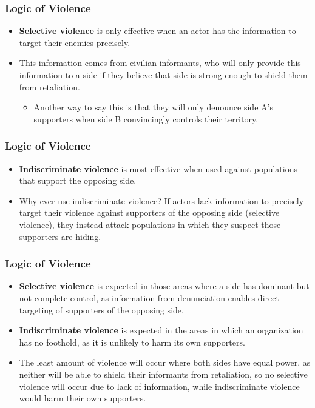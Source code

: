 \documentclass[handout]{beamer}
\begin{document}
\begin{frame} 
	\frametitle{\LARGE{Logic of Violence}}
	\begin{itemize}
		\item \textbf{Selective violence} is only effective when an actor has the information to target their enemies precisely. \pause
		\item This information comes from civilian informants, who will only provide this information to a side if they believe that side is strong enough to shield them from retaliation. 
		\begin{itemize}
			\item Another way to say this is that they will only denounce side A's supporters when side B convincingly controls their territory. \pause
		\end{itemize}
	\end{itemize}
\end{frame}

\begin{frame} 
	\frametitle{\LARGE{Logic of Violence}}
	\begin{itemize}
		\item \textbf{Indiscriminate violence} is most effective when used against populations that support the opposing side. \pause
		\item Why ever use indiscriminate violence? If actors lack information to precisely target their violence against supporters of the opposing side (selective violence), they instead attack populations in which they suspect those supporters are hiding. 
	\end{itemize}
\end{frame}


\begin{frame} 
	\frametitle{\LARGE{Logic of Violence}}
	\begin{itemize}
		\item \textbf{Selective violence} is expected in those areas where a side has dominant but not complete control, as information from denunciation enables direct targeting of supporters of the opposing side. \pause
		\item \textbf{Indiscriminate violence} is expected in the areas in which an organization has no foothold, as it is unlikely to harm its own supporters.
		\item The least amount of violence will occur where both sides have equal power, as neither will be able to shield their informants from retaliation, so no selective violence will occur due to lack of information, while indiscriminate violence would harm their own supporters.
	\end{itemize}
\end{frame}
\end{document}
